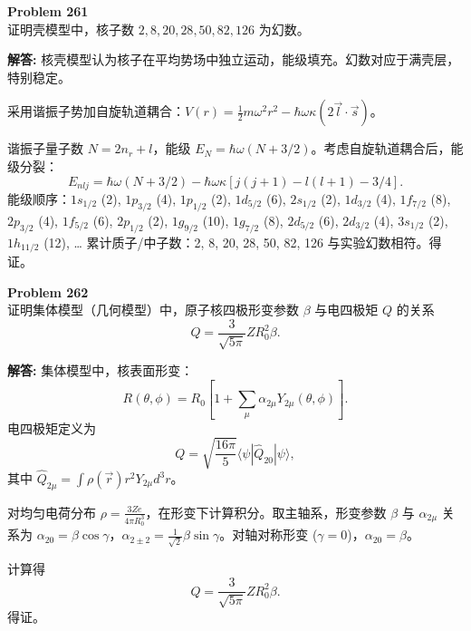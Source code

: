 \documentclass[12pt, a4paper, oneside]{ctexart}
\newenvironment{solution}{\par\noindent\textbf{解答:}\quad}{\par}
\begin{document}
\begin{mdframed}[backgroundcolor=gray!10, linewidth=0pt]
    \textbf{Problem 261} \\
    证明壳模型中，核子数 $2,8,20,28,50,82,126$ 为幻数。
\end{mdframed}
\begin{solution}
    核壳模型认为核子在平均势场中独立运动，能级填充。幻数对应于满壳层，特别稳定。

    采用谐振子势加自旋轨道耦合：$V(r) = \frac{1}{2} m \omega^2 r^2 - \hbar \omega \kappa (2\vec{l} \cdot \vec{s})$。

    谐振子量子数 $N = 2n_r + l$，能级 $E_{N} = \hbar \omega (N+3/2)$。考虑自旋轨道耦合后，能级分裂：
    \[
    E_{nlj} = \hbar \omega (N+3/2) - \hbar \omega \kappa [j(j+1) - l(l+1) - 3/4].
    \]
    能级顺序：$1s_{1/2}$ (2), $1p_{3/2}$ (4), $1p_{1/2}$ (2), $1d_{5/2}$ (6), $2s_{1/2}$ (2), $1d_{3/2}$ (4), $1f_{7/2}$ (8), $2p_{3/2}$ (4), $1f_{5/2}$ (6), $2p_{1/2}$ (2), $1g_{9/2}$ (10), $1g_{7/2}$ (8), $2d_{5/2}$ (6), $2d_{3/2}$ (4), $3s_{1/2}$ (2), $1h_{11/2}$ (12), … 累计质子/中子数：2, 8, 20, 28, 50, 82, 126 与实验幻数相符。得证。
\end{solution}

\begin{mdframed}[backgroundcolor=gray!10, linewidth=0pt]
    \textbf{Problem 262} \\
    证明集体模型（几何模型）中，原子核四极形变参数 $\beta$ 与电四极矩 $Q$ 的关系
    \[
    Q = \frac{3}{\sqrt{5\pi}} Z R_0^2 \beta.
    \]
\end{mdframed}
\begin{solution}
    集体模型中，核表面形变：
    \[
    R(\theta, \phi) = R_0 \left[ 1 + \sum_{\mu} \alpha_{2\mu} Y_{2\mu}(\theta, \phi) \right].
    \]
    电四极矩定义为
    \[
    Q = \sqrt{\frac{16\pi}{5}} \langle \psi | \hat{Q}_{20} | \psi \rangle,
    \]
    其中 $\hat{Q}_{2\mu} = \int \rho(\vec{r}) r^2 Y_{2\mu} d^3r$。

    对均匀电荷分布 $\rho = \frac{3Ze}{4\pi R_0^3}$，在形变下计算积分。取主轴系，形变参数 $\beta$ 与 $\alpha_{2\mu}$ 关系为 $\alpha_{20} = \beta \cos \gamma$，$\alpha_{2\pm2} = \frac{1}{\sqrt{2}} \beta \sin \gamma$。对轴对称形变 ($\gamma=0$)，$\alpha_{20} = \beta$。

    计算得
    \[
    Q = \frac{3}{\sqrt{5\pi}} Z R_0^2 \beta.
    \]
    得证。
\end{solution}
\end{document}
